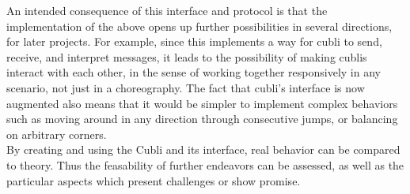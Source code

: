An intended consequence of this interface and protocol is that the implementation of the above opens up further possibilities in several directions, for later projects. 
For example, since this implements a way for cubli to send, receive, and interpret messages, it leads to the possibility of making cublis interact with each other, in the sense of working together responsively in any scenario, not just in a choreography.
The fact that cubli's interface is now augmented also means that it would be simpler to implement complex behaviors such as moving around in any direction through consecutive jumps, or balancing on arbitrary corners.\\

By creating and using the Cubli and its interface, real behavior can be compared to theory. Thus the feasability of further endeavors can be assessed, as well as the particular aspects which present challenges or show promise.

 \cleardoublepage


